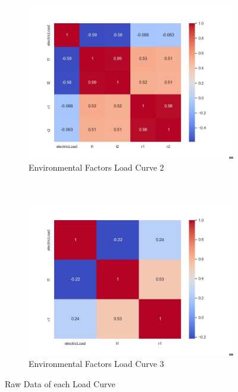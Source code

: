 \documentclass{article} %
\begin{document}
\begin{figure}[H]
    \centering
    \begin{subfigure}[b]{\textwidth}
        \centering
        \includegraphics[width=\textwidth]{ressources/Environmental/CorrelationElectricLoadFeatures.jpg}
        \caption{Environmental Factors Load Curve 2}
        \label{fig:Environmental2}
    \end{subfigure}
    \\
    \begin{subfigure}[b]{\textwidth}
        \centering
        \includegraphics[width=\textwidth]{ressources/Environmental/CorrelationElectricLoadFeatures(1).jpg}
        \caption{Environmental Factors Load Curve 3}
        \label{fig:Environmental3}
    \end{subfigure}
    \caption{Raw Data of each Load Curve}
    \label{fig:Environmental}
\end{figure}
\end{document}
